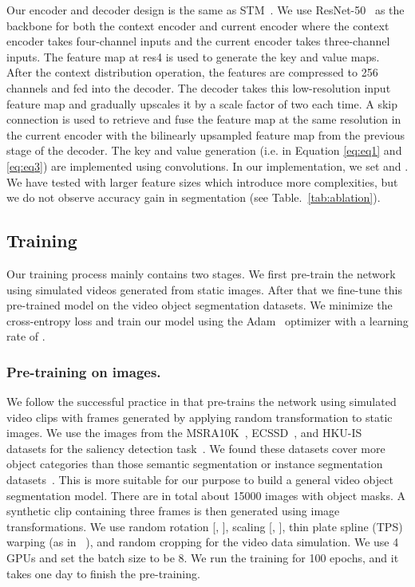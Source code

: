 \documentclass[runningheads]{llncs}
\begin{document}
Our encoder and decoder design is the same as STM~\cite{stm}. We use ResNet-50~\cite{resnet} as the backbone for both the context encoder and current encoder where the context encoder takes four-channel inputs and the current encoder takes three-channel inputs. The feature map at res4 is used to generate the key and value maps. After the context distribution operation, the features are compressed to 256 channels and fed into the decoder. The decoder takes this low-resolution input feature map and gradually upscales it by a scale factor of two each time. A skip connection is used to retrieve and fuse the feature map at the same resolution in the current encoder with the bilinearly upsampled feature map from the previous stage of the decoder.
The key and value generation (i.e.  in Equation \eqref{eq:eq1} and \eqref{eq:eq3}) are implemented using  convolutions. In our implementation, we set  and . We have tested with larger feature sizes which introduce more complexities, but we do not observe accuracy gain in segmentation (see Table.~\ref{tab:ablation}).

\subsection{Training}
\label{sec:train}

Our training process mainly contains two stages. We first pre-train the network using simulated videos generated from static images. After that we fine-tune this pre-trained model on the video object segmentation datasets. We minimize the cross-entropy loss and train our model using the Adam~\cite{adam} optimizer with a learning rate of .

\subsubsection{Pre-training on images.}
We follow the successful practice in \cite{stm,ranet,rgmp} that pre-trains the network using simulated video clips with frames generated by applying random transformation to static images. We use the images from the MSRA10K~\cite{msra10k}, ECSSD~\cite{ecssd}, and HKU-IS~\cite{hkuis} datasets for the saliency detection task~\cite{borji2015salient}. We found these datasets cover more object categories than those semantic segmentation or instance segmentation datasets~\cite{pascal-voc,sbd,coco}. This is more suitable for our purpose to build a general video object segmentation model. There are in total about 15000 images with object masks. A synthetic clip containing three frames is then generated using image transformations. We use random rotation [, ], scaling [, ], thin plate spline (TPS) warping (as in ~\cite{masktrack}), and random cropping for the video data simulation. We use 4 GPUs and set the batch size to be 8. We run the training for 100 epochs, and it takes one day to finish the pre-training.
\end{document}
